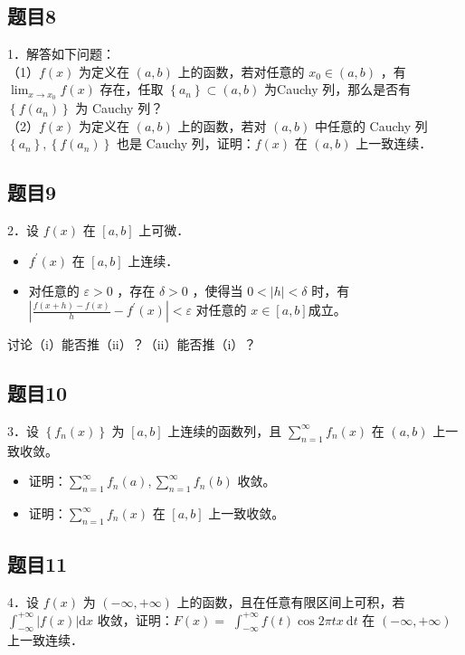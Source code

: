 \documentclass{article}
\begin{document}
\subsection{题目8}
1．解答如下问题：\\
（1）\(f(x)\) 为定义在 \((a, b)\) 上的函数，若对任意的 \(x_{0} \in(a, b)\) ，有 \(\lim _{x \rightarrow x_{0}} f(x)\) 存在，任取 \(\left\{a_{n}\right\} \subset(a, b)\) 为Cauchy 列，那么是否有 \(\left\{f\left(a_{n}\right)\right\}\) 为 Cauchy 列？\\
（2）\(f(x)\) 为定义在 \((a, b)\) 上的函数，若对 \((a, b)\) 中任意的 Cauchy 列 \(\left\{a_{n}\right\},\left\{f\left(a_{n}\right)\right\}\) 也是 Cauchy 列，证明：\(f(x)\) 在 \((a, b)\) 上一致连续．

\subsection{题目9}
2．设 \(f(x)\) 在 \([a, b]\) 上可微．

\begin{itemize}
  \item[（i）] \(f^{\prime}(x)\) 在 \([a, b]\) 上连续．
  \item[（ii）] 对任意的 \(\varepsilon>0\) ，存在 \(\delta>0\) ，使得当 \(0<|h|<\delta\) 时，有 \(\left|\frac{f(x+h)-f(x)}{h}-f^{\prime}(x)\right|<\varepsilon\) 对任意的 \(x \in[a, b]\)成立。
\end{itemize}

讨论（i）能否推（ii）？（ii）能否推（i）？

\subsection{题目10}
3．设 \(\left\{f_{n}(x)\right\}\) 为 \([a, b]\) 上连续的函数列，且 \(\sum_{n=1}^{\infty} f_{n}(x)\) 在 \((a, b)\) 上一致收敛。

\begin{itemize}
  \item[（1）] 证明：\(\sum_{n=1}^{\infty} f_{n}(a), \sum_{n=1}^{\infty} f_{n}(b)\) 收敛。
  \item[（2）] 证明：\(\sum_{n=1}^{\infty} f_{n}(x)\) 在 \([a, b]\) 上一致收敛。
\end{itemize}

\subsection{题目11}
4．设 \(f(x)\) 为 \((-\infty,+\infty)\) 上的函数，且在任意有限区间上可积，若 \(\int_{-\infty}^{+\infty}|f(x)| \mathrm{d} x\) 收敛，证明：\(F(x)=\) \(\int_{-\infty}^{+\infty} f(t) \cos 2 \pi t x \mathrm{~d} t\) 在 \((-\infty,+\infty)\) 上一致连续．
\end{document}
